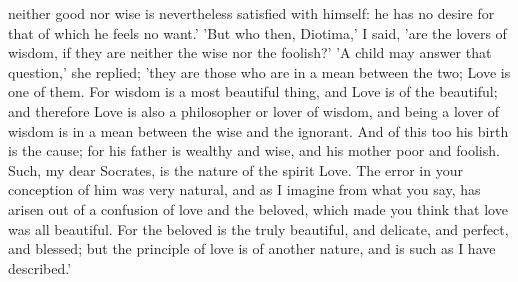 \documentclass[11pt,letter]{article}
\begin{document}
neither good nor wise is nevertheless satisfied with himself: he has no desire for that of which he feels no want.' 'But who then, Diotima,' I said, 'are the lovers of wisdom, if they are neither the wise nor the foolish?' 'A child may answer that question,' she replied; 'they are those who are in a mean between the two; Love is one of them. For wisdom is a most beautiful thing, and Love is of the beautiful; and therefore Love is also a philosopher or lover of wisdom, and being a lover of wisdom is in a mean between the wise and the ignorant. And of this too his birth is the cause; for his father is wealthy and wise, and his mother poor and foolish. Such, my dear Socrates, is the nature of the spirit Love. The error in your conception of him was very natural, and as I imagine from what you say, has arisen out of a confusion of love and the beloved, which made you think that love was all beautiful. For the beloved is the truly beautiful, and delicate, and perfect, and blessed; but the principle of love is of another nature, and is such as I have described.'
\end{document}
